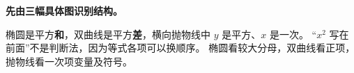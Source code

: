 \begin{explanationbox}
\textbf{先由三幅具体图识别结构。}

椭圆是平方\textbf{和}，双曲线是平方\textbf{差}，横向抛物线中 $y$ 是平方、$x$ 是一次。
“$x^2$ 写在前面”不是判断法，因为等式各项可以换顺序。
椭圆看较大分母，双曲线看正项，抛物线看一次项变量及符号。
\end{explanationbox}
\clearpage
